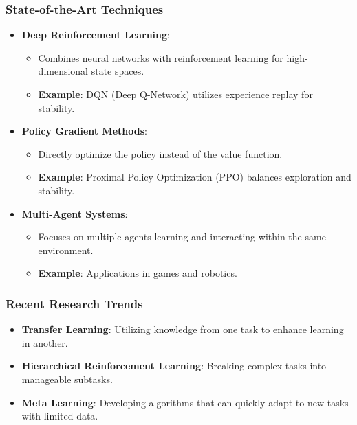 \documentclass{beamer}
\begin{document}
\begin{frame}[fragile]
    \frametitle{State-of-the-Art Techniques}
    \begin{itemize}
        \item \textbf{Deep Reinforcement Learning}:
        \begin{itemize}
            \item Combines neural networks with reinforcement learning for high-dimensional state spaces.
            \item \textbf{Example}: DQN (Deep Q-Network) utilizes experience replay for stability.
        \end{itemize}
        
        \item \textbf{Policy Gradient Methods}:
        \begin{itemize}
            \item Directly optimize the policy instead of the value function.
            \item \textbf{Example}: Proximal Policy Optimization (PPO) balances exploration and stability.
        \end{itemize}
        
        \item \textbf{Multi-Agent Systems}:
        \begin{itemize}
            \item Focuses on multiple agents learning and interacting within the same environment.
            \item \textbf{Example}: Applications in games and robotics.
        \end{itemize}
    \end{itemize}
\end{frame}

\begin{frame}[fragile]
    \frametitle{Recent Research Trends}
    \begin{itemize}
        \item \textbf{Transfer Learning}: Utilizing knowledge from one task to enhance learning in another.
        \item \textbf{Hierarchical Reinforcement Learning}: Breaking complex tasks into manageable subtasks.
        \item \textbf{Meta Learning}: Developing algorithms that can quickly adapt to new tasks with limited data.
    \end{itemize}
\end{frame}
\end{document}
